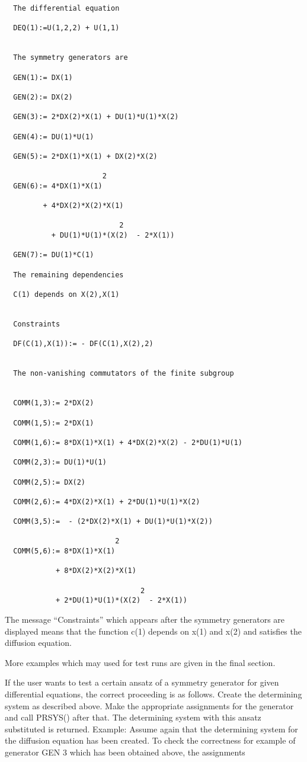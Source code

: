 \begin{verbatim}
  The differential equation

  DEQ(1):=U(1,2,2) + U(1,1)


  The symmetry generators are

  GEN(1):= DX(1)

  GEN(2):= DX(2)

  GEN(3):= 2*DX(2)*X(1) + DU(1)*U(1)*X(2)

  GEN(4):= DU(1)*U(1)

  GEN(5):= 2*DX(1)*X(1) + DX(2)*X(2)

                       2
  GEN(6):= 4*DX(1)*X(1)

         + 4*DX(2)*X(2)*X(1)

                           2
           + DU(1)*U(1)*(X(2)  - 2*X(1))

  GEN(7):= DU(1)*C(1)

  The remaining dependencies

  C(1) depends on X(2),X(1)


  Constraints

  DF(C(1),X(1)):= - DF(C(1),X(2),2)


  The non-vanishing commutators of the finite subgroup


  COMM(1,3):= 2*DX(2)

  COMM(1,5):= 2*DX(1)

  COMM(1,6):= 8*DX(1)*X(1) + 4*DX(2)*X(2) - 2*DU(1)*U(1)

  COMM(2,3):= DU(1)*U(1)

  COMM(2,5):= DX(2)

  COMM(2,6):= 4*DX(2)*X(1) + 2*DU(1)*U(1)*X(2)

  COMM(3,5):=  - (2*DX(2)*X(1) + DU(1)*U(1)*X(2))

                          2
  COMM(5,6):= 8*DX(1)*X(1)

            + 8*DX(2)*X(2)*X(1)

                                2
            + 2*DU(1)*U(1)*(X(2)  - 2*X(1))
\end{verbatim}

The message ``Constraints'' which appears after the symmetry generators
are displayed means that the function c(1) depends on x(1) and x(2)
and satisfies the diffusion equation.

More examples which may used for test runs are given in the final
section.

If the user wants to test a certain ansatz of a symmetry generator for
given differential equations, the correct proceeding is as follows.
Create the determining system as described above. Make the appropriate
assignments for the generator and call PRSYS() after that.  The
determining system with this ansatz substituted is returned.  Example:
Assume again that the determining system for the diffusion equation
has been created. To check the correctness for example of generator GEN
3 which has been obtained above, the assignments

